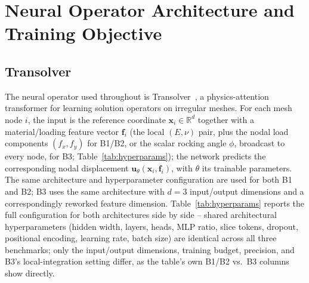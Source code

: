 \documentclass[final,5p,times]{elsarticle}
\begin{document}
\FloatBarrier
\section{Neural Operator Architecture and Training Objective}
\label{sec:architecture}

\subsection{Transolver}
The neural operator used throughout is Transolver~\cite{wu2024transolver}, a
physics-attention transformer for learning solution operators on irregular
meshes. For each mesh node $i$, the input is the reference coordinate
$\mathbf{x}_i \in \mathbb{R}^d$ together with a material/loading feature
vector $\mathbf{f}_i$ (the local $(E,\nu)$ pair, plus the nodal load
components $(f_x,f_y)$ for B1/B2, or the scalar rocking angle $\phi$,
broadcast to every node, for B3; Table~\ref{tab:hyperparams}); the network predicts the corresponding nodal displacement
$\mathbf{u}_\theta(\mathbf{x}_i,\mathbf{f}_i)$, with $\theta$ its trainable
parameters. The same architecture and hyperparameter configuration are used
for both B1 and B2; B3 uses the same architecture with $d{=}3$ input/output
dimensions and a correspondingly reworked feature dimension.
Table~\ref{tab:hyperparams} reports the full configuration for both
architectures side by side -- shared architectural hyperparameters
(hidden width, layers, heads, MLP ratio, slice tokens, dropout,
positional encoding, learning rate, batch size) are identical across
all three benchmarks; only the input/output dimensions, training
budget, precision, and B3's local-integration setting differ, as the
table's own B1/B2 vs.\ B3 columns show directly.
\end{document}
